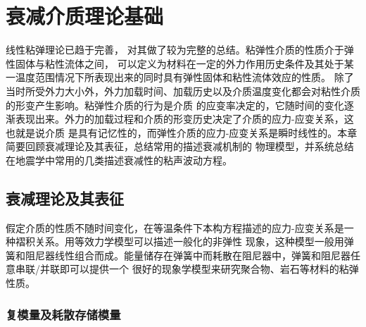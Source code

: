 
\chapter{衰减介质理论基础}

线性粘弹理论已趋于完善， 对其做了较为完整的总结。粘弹性介质的性质介于弹性固体与粘性流体之间，
可以定义为材料在一定的外力作用历史条件及其处于某一温度范围情况下所表现出来的同时具有弹性固体和粘性流体效应的性质。
除了当时所受外力大小外，外力加载时间、加载历史以及介质温度变化都会对粘性介质的形变产生影响。粘弹性介质的行为是介质
的应变率决定的，它随时间的变化逐渐表现出来。外力的加载过程和介质的形变历史决定了介质的应力-应变关系，这也就是说介质
是具有记忆性的，而弹性介质的应力-应变关系是瞬时线性的。本章简要回顾衰减理论及其表征，总结常用的描述衰减机制的
物理模型，并系统总结在地震学中常用的几类描述衰减性的粘声波动方程。

\vspace{1.0cm}

\section{衰减理论及其表征}

假定介质的性质不随时间变化，在等温条件下本构方程描述的应力-应变关系是一种褶积关系。用等效力学模型可以描述一般化的非弹性
现象，这种模型一般用弹簧和阻尼器线性组合而成。能量储存在弹簧中而耗散在阻尼器中，弹簧和阻尼器任意串联/并联即可以提供一个
很好的现象学模型来研究聚合物、岩石等材料的粘弹性质。


\vspace{0.5cm}

\subsection{复模量及耗散存储模量}

